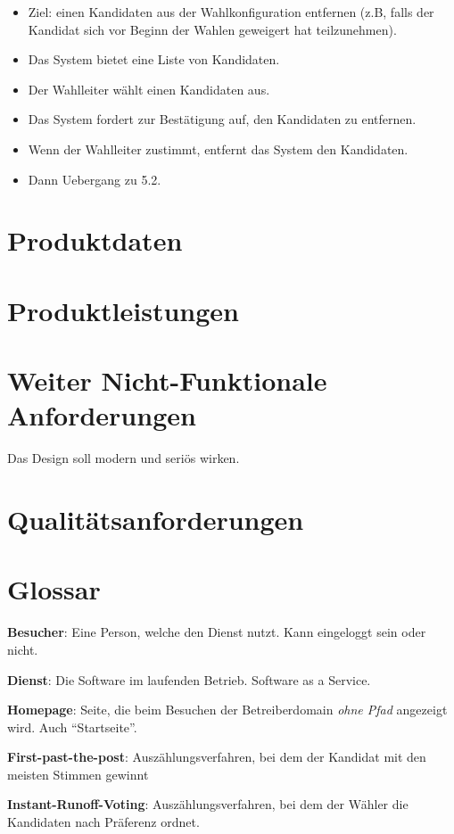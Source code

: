 \documentclass[parskip=full,11pt,twoside]{scrartcl}
\begin{document}
\begin{itemize}
	\item Ziel: einen Kandidaten aus der Wahlkonfiguration entfernen (z.B, falls der Kandidat sich vor Beginn der Wahlen geweigert hat teilzunehmen).
	\item Das System bietet eine Liste von Kandidaten.
	\item Der Wahlleiter wählt einen Kandidaten aus.
	\item Das System fordert zur Bestätigung auf, den Kandidaten zu entfernen.
	\item Wenn der Wahlleiter zustimmt, entfernt das System den Kandidaten.
	\item Dann Uebergang zu 5.2.
\end{itemize}

\section{Produktdaten}

\section{Produktleistungen}


\section{Weiter Nicht-Funktionale Anforderungen}


Das Design soll modern und seriös wirken.


\section{Qualitätsanforderungen}



\section{Glossar}

\textbf{Besucher}:
Eine Person, welche den Dienst nutzt.
Kann eingeloggt sein oder nicht.

\textbf{Dienst}:
Die Software im laufenden Betrieb. Software as a Service.

\textbf{Homepage}:
Seite, die beim Besuchen der Betreiberdomain \emph{ohne Pfad} angezeigt wird. Auch \enquote{Startseite}.

\textbf{First-past-the-post}:
Auszählungsverfahren, bei dem der Kandidat mit den meisten Stimmen gewinnt

\textbf{Instant-Runoff-Voting}:
Auszählungsverfahren, bei dem der Wähler die Kandidaten nach Präferenz ordnet.
\end{document}
